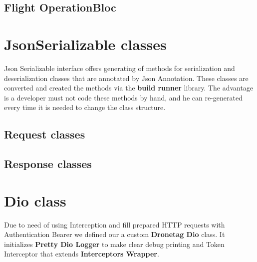 \subsection{Flight OperationBloc}\label{subsec:flight-operationbloc}

\section{JsonSerializable classes}\label{sec:jsonserializable-classes}
Json Serializable interface offers generating of  methods for serialization and deserialization classes that are annotated by Json Annotation.
These classes are converted and created the methods via the \textbf{build runner} library.
The advantage is a developer must not code these methods by hand, and he can re-generated every time it is needed to change the class structure.

\subsection{Request classes}\label{subsec:request-classes}
\subsection{Response classes}\label{subsec:response-classes}

\section{Dio class}\label{sec:dio-class}
Due to need of using Interception and fill prepared HTTP requests with Authentication Bearer we defined our a custom \textbf{Dronetag Dio} class.
It initializes \textbf{Pretty Dio Logger} to make clear debug printing and Token Interceptor that extends \textbf{Interceptors Wrapper}.
